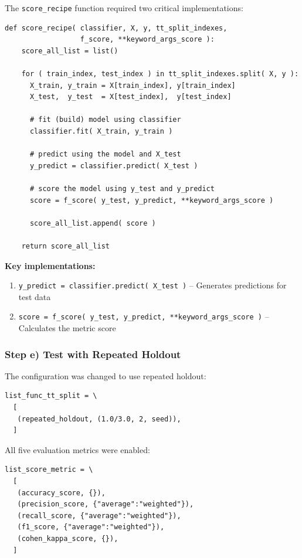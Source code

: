 \documentclass[12pt,a4paper]{article}
\begin{document}
The \texttt{score\_recipe} function required two critical implementations:

\begin{lstlisting}[caption={Completed score\_recipe function}]
def score_recipe( classifier, X, y, tt_split_indexes,
                  f_score, **keyword_args_score ):
    score_all_list = list()

    for ( train_index, test_index ) in tt_split_indexes.split( X, y ):
      X_train, y_train = X[train_index], y[train_index]
      X_test,  y_test  = X[test_index],  y[test_index]

      # fit (build) model using classifier
      classifier.fit( X_train, y_train )

      # predict using the model and X_test
      y_predict = classifier.predict( X_test )

      # score the model using y_test and y_predict
      score = f_score( y_test, y_predict, **keyword_args_score )
      
      score_all_list.append( score )

    return score_all_list
\end{lstlisting}

\textbf{Key implementations:}
\begin{enumerate}
    \item \texttt{y\_predict = classifier.predict( X\_test )} -- Generates predictions for test data
    \item \texttt{score = f\_score( y\_test, y\_predict, **keyword\_args\_score )} -- Calculates the metric score
\end{enumerate}

\subsubsection{Step e) Test with Repeated Holdout}

The configuration was changed to use repeated holdout:

\begin{lstlisting}[caption={Repeated holdout configuration}]
list_func_tt_split = \
  [
   (repeated_holdout, (1.0/3.0, 2, seed)),
  ]
\end{lstlisting}

All five evaluation metrics were enabled:

\begin{lstlisting}[caption={All evaluation metrics}]
list_score_metric = \
  [
   (accuracy_score, {}),
   (precision_score, {"average":"weighted"}),
   (recall_score, {"average":"weighted"}),
   (f1_score, {"average":"weighted"}),
   (cohen_kappa_score, {}),
  ]
\end{lstlisting}
\end{document}
